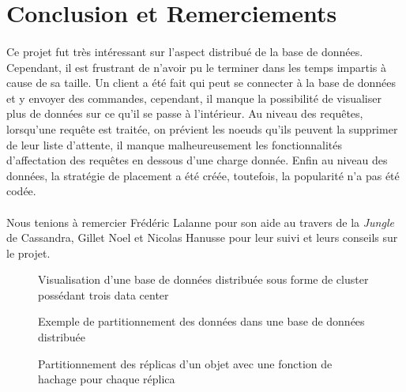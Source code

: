 \documentclass[12pt]{article}
\begin{document}
\paragraph{}

\section{Conclusion et Remerciements}

\paragraph{}Ce projet fut très intéressant sur l'aspect distribué de la base de données. Cependant, il est frustrant de n'avoir pu le terminer dans les temps impartis à cause de sa taille. Un client a été fait qui peut se connecter à la base de données et y envoyer des commandes, cependant, il manque la possibilité de visualiser plus de données sur ce qu'il se passe à l'intérieur. Au niveau des requêtes, lorsqu'une requête est traitée, on prévient les noeuds qu'ils peuvent la supprimer de leur liste d'attente, il manque malheureusement les fonctionnalités d'affectation des requêtes en dessous d'une charge donnée. Enfin au niveau des données, la stratégie de placement a été créée, toutefois, la popularité n'a pas été codée.

\paragraph{}Nous tenions à remercier Frédéric Lalanne pour son aide au travers de la \textit{Jungle} de Cassandra, Gillet Noel et Nicolas Hanusse pour leur suivi et leurs conseils sur le projet.





\begin{figure}[H]
	\centering
		
	\caption{Visualisation d'une base de données distribuée sous forme de cluster possédant trois data center\label{fig:distributed_database}}
\end{figure}

\begin{figure}[H]
	\centering
		
	\caption{Exemple de partitionnement des données dans une base de données distribuée\label{fig:partitionning}}
\end{figure}

\begin{figure}[H]
	\centering
		
	\caption{Partitionnement des réplicas d'un objet avec une fonction de hachage pour chaque réplica\label{fig:multi_hash_partitionning}}
\end{figure}
\end{document}
